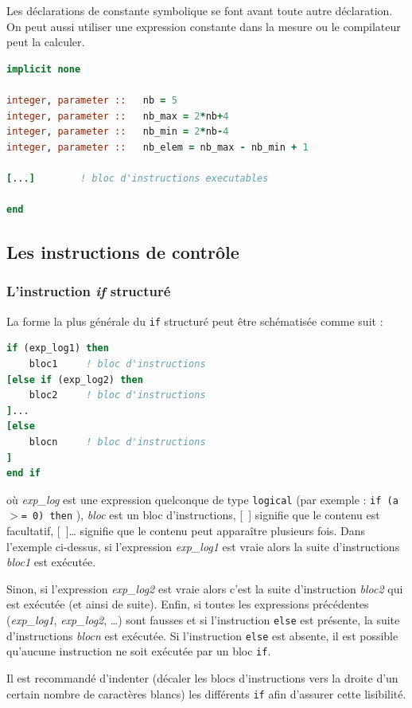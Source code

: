 \documentclass[a4paper,twoside]{article}
\begin{document}
Les déclarations de constante symbolique se font avant toute autre déclaration. On peut aussi utiliser une expression constante dans la mesure ou le compilateur peut la calculer. 

\begin{lstlisting}[language=Fortran]
implicit none
  
integer, parameter ::   nb = 5
integer, parameter ::   nb_max = 2*nb+4
integer, parameter ::   nb_min = 2*nb-4
integer, parameter ::   nb_elem = nb_max - nb_min + 1

[...]        ! bloc d'instructions executables 

end
\end{lstlisting}

\subsection{Les instructions de contrôle}
\subsubsection{L'instruction \emph{if} structuré}

La forme la plus générale du \texttt{if} structuré peut être 
schématisée comme suit :
\begin{lstlisting}[language=Fortran]
if (exp_log1) then
    bloc1     ! bloc d'instructions 
[else if (exp_log2) then 
    bloc2     ! bloc d'instructions 
]...
[else
    blocn     ! bloc d'instructions 
] 
end if
\end{lstlisting}
où \emph{exp\_log} est une expression quelconque de type \texttt{logical} (par exemple : \texttt{if (a $>$= 0) then} ), \emph{bloc} est un bloc d'instruc\-tions, \mbox{[ ]} signifie que le contenu est facultatif, \mbox{[ ]\ldots} signifie que le contenu peut apparaître plusieurs fois. Dans l'exemple ci-dessus, si l'expression \emph{exp\_log1} est vraie alors la suite d'instruc\-tions \emph{bloc1} est exécutée. 

Sinon, si l'expression \emph{exp\_log2} est vraie alors c'est la suite d'instruction \emph{bloc2} qui est exécutée (et ainsi de suite). Enfin, si toutes les expressions précédentes (\emph{exp\_log1}, \emph{exp\_log2}, \ldots) sont fausses et si l'instruction \texttt{else} est présente, la suite d'instructions \emph{blocn} est exécutée. Si l'instruc\-tion \texttt{else} est absente, il est possible qu'aucune instruction ne soit exécutée par un bloc \texttt{if}.

\begin{remarque}
Il est recommandé d'indenter (décaler les blocs d'instructions vers la droite d'un certain nombre de caractères blancs) les différents \texttt{if} afin d'assurer cette lisibilité. 
\end{remarque}
\end{document}
